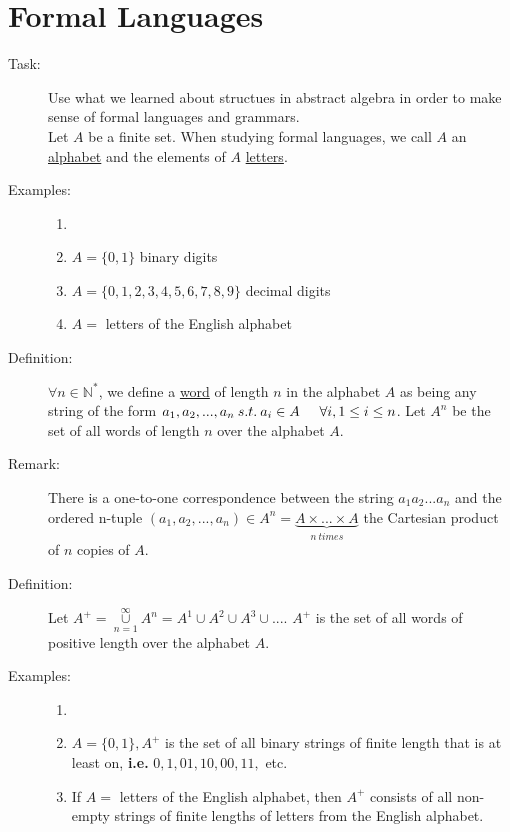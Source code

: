 \documentclass[10pt]{article}
\begin{document}
	\section{Formal Languages}
	\begin{description}
		\item[Task:] Use what we learned about structues in abstract algebra in order to make sense of formal languages and grammars. \\
		Let $A$ be a finite set. When studying formal languages, we call $A$ an \underline{alphabet} and the elements of $A$ \underline{letters}.
		\item[Examples:]
		\begin{enumerate}
			\item[]
			\item $A = \{0, 1\}$ \hspace{10mm} binary digits
			\item $A = \{0, 1, 2, 3, 4, 5, 6, 7, 8, 9\}$ \hspace{10mm} decimal digits
			\item $A =$ {letters of the English alphabet}
		\end{enumerate}
		\item[Definition:] $\forall n \in \mathbb{N}^*$, we define a \underline{word} of length $n$ in the alphabet $A$ as being any string of the form $a_1, a_2, ..., a_n \: s.t. \: a_i \in A \hspace{5mm} \forall i, 1 \leq i \leq n$. Let $A^n$ be the set of all words of length $n$ over the alphabet $A$.
		\item[Remark:] There is a one-to-one correspondence between the string $a_1a_2...a_n$ and the ordered n-tuple $(a_1, a_2, ..., a_n) \in A^n = \underset{n \: times}{\underbrace{A \times ... \times A}}$ the Cartesian product of $n$ copies of $A$.
		\item[Definition:] Let $A^+ = \underset{n=1}{\overset{\infty}{\cup}} A^n = A^1 \cup A^2 \cup A^3 \cup ...$. $A^+$ is the set of all words of positive length over the alphabet $A$.
		\item[Examples:]
		\begin{enumerate}
			\item[]
			\item $A = \{0, 1\}, A^+$ is the set of all binary strings of finite length that is at least on, \textbf{i.e.} $0, 1, 01, 10, 00, 11,$ etc.
			\item If $A =$ {letters of the English alphabet}, then $A^+$ consists of all non-empty strings of finite lengths of letters from the English alphabet. \\

\end{enumerate}
\end{description}
\end{document}
